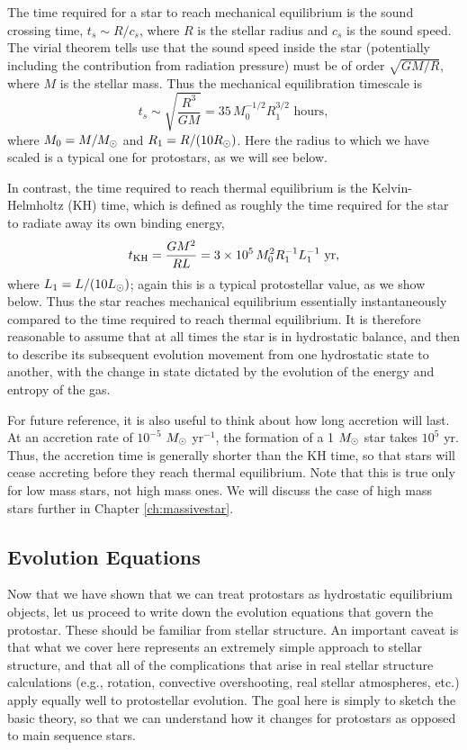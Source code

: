 The time required for a star to reach mechanical equilibrium is the sound crossing time, $t_s\sim R/c_s$, where $R$ is the stellar radius and $c_s$ is the sound speed. The virial theorem tells use that the sound speed inside the star (potentially including the contribution from radiation pressure) must be of order $\sqrt{GM/R}$, where $M$ is the stellar mass. Thus the mechanical equilibration timescale is
\begin{equation}
t_s \sim \sqrt{\frac{R^3}{GM}} = 35\, M_0^{-1/2} R_1^{3/2}\mbox{ hours},
\end{equation}
where $M_0 = M / M_{\odot}$ and $R_{1} = R/(10R_{\odot})$. Here the radius to which we have scaled is a typical one for protostars, as we will see below.

In contrast, the time required to reach thermal equilibrium is the Kelvin-Helmholtz (KH) time, which is defined as roughly the time required for the star to radiate away its own binding energy,
\begin{equation}
t_{\rm KH} = \frac{GM^2}{RL} = 3\times 10^5\, M_0^2 R_1^{-1} L_1^{-1}\mbox{ yr},
\end{equation}
where $L_1 = L/(10 L_{\odot})$; again this is a typical protostellar value, as we show below. Thus the star reaches mechanical equilibrium essentially instantaneously compared to the time required to reach thermal equilibrium. It is therefore reasonable to assume that at all times the star is in hydrostatic balance, and then to describe its subsequent evolution movement from one hydrostatic state to another, with the change in state dictated by the evolution of the energy and entropy of the gas. 

For future reference, it is also useful to think about how long accretion will last. At an accretion rate of $10^{-5}$ $M_{\odot}$ yr$^{-1}$, the formation of a 1 $M_{\odot}$ star takes $10^5$ yr. Thus, the accretion time is generally shorter than the KH time, so that stars will cease accreting before they reach thermal equilibrium. Note that this is true only for low mass stars, not high mass ones. We will discuss the case of high mass stars further in Chapter \ref{ch:massivestar}.

\subsection{Evolution Equations}

Now that we have shown that we can treat protostars as hydrostatic equilibrium objects, let us proceed to write down the evolution equations that govern the protostar. These should be familiar from stellar structure. An important caveat is that what we cover here represents an extremely simple approach to stellar structure, and that all of the complications that arise in real stellar structure calculations (e.g., rotation, convective overshooting, real stellar atmospheres, etc.) apply equally well to protostellar evolution. The goal here is simply to sketch the basic theory, so that we can understand how it changes for protostars as opposed to main sequence stars.

